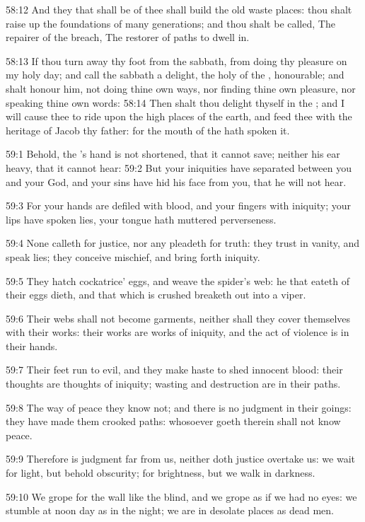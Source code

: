 58:12 And they that shall be of thee shall build the old waste places: thou shalt raise up the foundations of many generations; and thou shalt be called, The repairer of the breach, The restorer of paths to dwell in.

58:13 If thou turn away thy foot from the sabbath, from doing thy pleasure on my holy day; and call the sabbath a delight, the holy of the \LORD, honourable; and shalt honour him, not doing thine own ways, nor finding thine own pleasure, nor speaking thine own words: 58:14 Then shalt thou delight thyself in the \LORD; and I will cause thee to ride upon the high places of the earth, and feed thee with the heritage of Jacob thy father: for the mouth of the \LORD hath spoken it.

59:1 Behold, the \LORD's hand is not shortened, that it cannot save; neither his ear heavy, that it cannot hear: 59:2 But your iniquities have separated between you and your God, and your sins have hid his face from you, that he will not hear.

59:3 For your hands are defiled with blood, and your fingers with iniquity; your lips have spoken lies, your tongue hath muttered perverseness.

59:4 None calleth for justice, nor any pleadeth for truth: they trust in vanity, and speak lies; they conceive mischief, and bring forth iniquity.

59:5 They hatch cockatrice' eggs, and weave the spider's web: he that eateth of their eggs dieth, and that which is crushed breaketh out into a viper.

59:6 Their webs shall not become garments, neither shall they cover themselves with their works: their works are works of iniquity, and the act of violence is in their hands.

59:7 Their feet run to evil, and they make haste to shed innocent blood: their thoughts are thoughts of iniquity; wasting and destruction are in their paths.

59:8 The way of peace they know not; and there is no judgment in their goings: they have made them crooked paths: whosoever goeth therein shall not know peace.

59:9 Therefore is judgment far from us, neither doth justice overtake us: we wait for light, but behold obscurity; for brightness, but we walk in darkness.

59:10 We grope for the wall like the blind, and we grope as if we had no eyes: we stumble at noon day as in the night; we are in desolate places as dead men.

